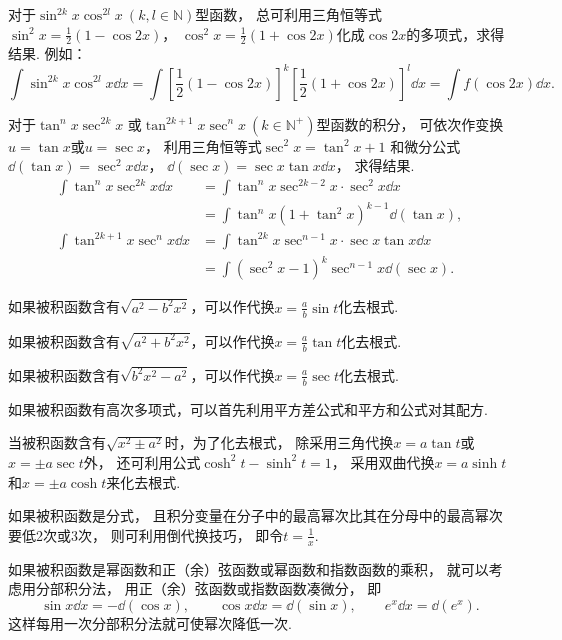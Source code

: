 对于\(\sin^{2k} x \cos^{2l} x\ (k,l \in \mathbb{N})\)型函数，
总可利用三角恒等式\(\sin^2 x = \frac12(1-\cos 2x)\)，
\(\cos^2 x = \frac12(1+\cos 2x)\)化成\(\cos 2x\)的多项式，求得结果.
例如：\begin{equation*}
	\int \sin^{2k} x \cos^{2l} x \dd{x}
	= \int \left[\frac12(1-\cos 2x)\right]^k
		\left[\frac12(1+\cos 2x)\right]^l \dd{x}
	= \int f(\cos 2x) \dd{x}.
\end{equation*}

对于\(\tan^n x \sec^{2k} x\)
或\(\tan^{2k+1} x \sec^n x\ (k \in \mathbb{N}^+)\)型函数的积分，
可依次作变换\(u=\tan x\)或\(u=\sec x\)，
利用三角恒等式\(\sec^2 x = \tan^2 x + 1\)
和微分公式\(\dd(\tan x) = \sec^2 x \dd{x}\)，
\(\dd(\sec x) = \sec x \tan x \dd{x}\)，
求得结果.
\begin{align*}
	\int \tan^n x \sec^{2k} x \dd{x}
	&=\int \tan^n x\sec^{2k-2} x \cdot \sec^2 x \dd{x} \\
	&=\int \tan^n x(1+\tan^2 x)^{k-1} \dd(\tan x), \\
	\int \tan^{2k+1} x \sec^n x \dd{x}
	&=\int \tan^{2k} x \sec^{n-1} x \cdot \sec x\tan x\dd{x} \\
	&=\int (\sec^2 x - 1)^k \sec^{n-1} x \dd(\sec x).
\end{align*}

如果被积函数含有\(\sqrt{a^2 - b^2 x^2}\)，可以作代换\(x = \frac{a}{b} \sin t\)化去根式.

如果被积函数含有\(\sqrt{a^2 + b^2 x^2}\)，可以作代换\(x = \frac{a}{b} \tan t\)化去根式.

如果被积函数含有\(\sqrt{b^2 x^2 - a^2}\)，可以作代换\(x = \frac{a}{b} \sec t\)化去根式.

如果被积函数有高次多项式，可以首先利用平方差公式和平方和公式对其配方.

当被积函数含有\(\sqrt{x^2 \pm a^2}\)时，为了化去根式，
除采用三角代换\(x = a \tan t\)或\(x = \pm a \sec t\)外，
还可利用公式\(\cosh^2 t - \sinh^2 t = 1\)，
采用双曲代换\(x = a \sinh t\)和\(x = \pm a \cosh t\)来化去根式.

如果被积函数是分式，
且积分变量在分子中的最高幂次比其在分母中的最高幂次要低2次或3次，
则可利用倒代换技巧，
即令\(t=\frac{1}{x}\).

如果被积函数是幂函数和正（余）弦函数或幂函数和指数函数的乘积，
就可以考虑用分部积分法，
用正（余）弦函数或指数函数凑微分，
即\begin{equation*}
	\sin x \dd{x} = -\dd(\cos x),
	\qquad
	\cos x \dd{x} = \dd(\sin x),
	\qquad
	e^x \dd{x} = \dd(e^x).
\end{equation*}
这样每用一次分部积分法就可使幂次降低一次.

